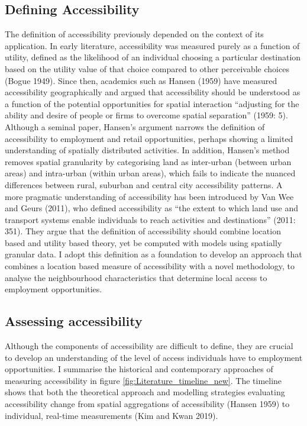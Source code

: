 \documentclass[a4paper,UKenglish]{lipics-v2018}
\begin{document}
\subsection{Defining Accessibility}
The definition of accessibility previously depended on the context of its application. In early literature, accessibility was measured purely as a function of utility, defined as the likelihood of an individual choosing a particular destination based on the utility value of that choice compared to other perceivable choices (Bogue 1949). Since then, academics such as Hansen (1959) have measured accessibility geographically and argued that accessibility should be understood as a function of the potential opportunities for spatial interaction “adjusting for the ability and desire of people or firms to overcome spatial separation” (1959: 5). Although a seminal paper, Hansen’s argument narrows the definition of accessibility to employment and retail opportunities, perhaps showing a limited understanding of spatially distributed activities. In addition, Hansen's method removes spatial granularity by categorising land as inter-urban (between urban areas) and intra-urban (within urban areas), which fails to indicate the nuanced differences between rural, suburban and central city accessibility patterns. A more pragmatic understanding of accessibility has been introduced by Van Wee and Geurs (2011), who defined accessibility as “the extent to which land use and transport systems enable individuals to reach activities and destinations” (2011: 351). They argue that the definition of accessibility should combine location based and utility based theory, yet be computed with models using spatially granular data. I adopt this definition as a foundation to develop an approach that combines a location based measure of accessibility with a novel methodology, to analyse the neighbourhood characteristics that determine local access to employment opportunities.

\subsection{Assessing accessibility}
Although the components of accessibility are difficult to define, they are crucial to develop an understanding of the level of access individuals have to employment opportunities. I summarise the historical and contemporary approaches of measuring accessibility in figure \ref{fig:Literature_timeline_new}. The timeline shows that both the theoretical approach and modelling strategies evaluating accessibility change from spatial aggregations of accessibility (Hansen 1959) to individual, real-time measurements (Kim and Kwan 2019). 
\end{document}
